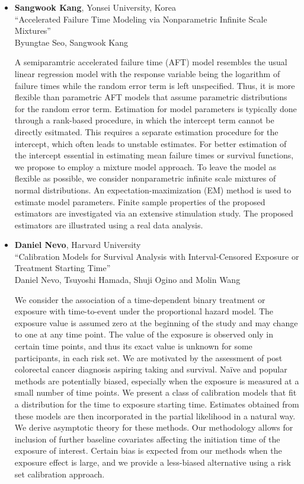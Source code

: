 \begin{itemize}
\item \textbf{Sangwook Kang}, Yonsei University, Korea \\
``Accelerated Failure Time Modeling via Nonparametric Infinite Scale Mixtures'' \\
Byungtae Seo, Sangwook Kang


A semiparamtric accelerated failure time (AFT) model resembles the usual linear regression model with the response variable being the logarithm of failure times while the random error term is left unspecified. Thus, it is more flexible than parametric AFT models that
assume parametric distributions for the random error term. Estimation for model parameters is typically done through a rank-based procedure, in which the intercept term cannot be directly esitmated. This requires a separate estimation procedure for the intercept, which often leads to unstable estimates. For better estimation of the intercept essential in estimating mean failure times or survival functions, we propose to employ a mixture model approach. To leave the model as 
flexible as possible, we consider nonparametric infinite scale mixtures of normal distributions. An expectation-maximization (EM) method is used to estimate model parameters. Finite sample properties of the proposed estimators are investigated via
an extensive stimulation study. The proposed estimators are illustrated using a real data analysis.

\item \textbf{Daniel Nevo}, Harvard University \\
``Calibration Models for Survival Analysis with Interval-Censored Exposure or Treatment Starting Time'' \\
Daniel Nevo, Tsuyoshi Hamada, Shuji Ogino and Molin Wang


We consider the association of a time-dependent binary treatment or exposure with time-to-event under the proportional hazard model. The exposure value is assumed zero at the beginning of the study and may change to one at any time point. The value of the exposure is observed only in certain time points, and thus its exact value is unknown for some participants, in each risk set. We are motivated by the assessment of post colorectal cancer diagnosis aspiring taking and survival. Naïve and popular methods are potentially biased, especially when the exposure is measured at a small number of time points. We present a class of calibration models that fit a distribution for the time to exposure starting time. Estimates obtained from these models are then incorporated in the partial likelihood in a natural way. We derive asymptotic theory for these methods. Our methodology allows for inclusion of further baseline covariates affecting the initiation time of the exposure of interest.  Certain bias is expected from our methods when the exposure effect is large, and we provide a less-biased alternative using a risk set calibration approach. 


\end{itemize}
